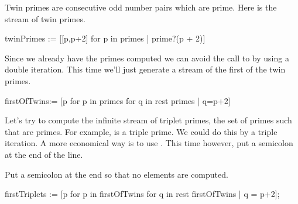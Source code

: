 {\begin{xtc}
\begin{TeXOutput}
\begin{fricasmath}{6}
\end{fricasmath}
\end{TeXOutput}
\end{xtc}
\begin{xtc}
\begin{xtccomment}
Twin primes are consecutive odd number pairs which are prime.
Here is the stream of twin primes.
\end{xtccomment}
\begin{spadsrc}
twinPrimes := [[p,p+2] for p in primes | prime?(p + 2)]
\end{spadsrc}
\begin{TeXOutput}
\begin{fricasmath}{7}
%
\end{fricasmath}
\end{TeXOutput}
\end{xtc}
\begin{xtc}
\begin{xtccomment}
Since we already have the primes computed we can
avoid the call to 
by using a double iteration.
This time we'll just generate a stream of the first of the twin primes.
\end{xtccomment}
\begin{spadsrc}
firstOfTwins:= [p for p in primes for q in rest primes | q=p+2]
\end{spadsrc}
\begin{TeXOutput}
\begin{fricasmath}{8}
%
\end{fricasmath}
\end{TeXOutput}
\end{xtc}

Let's try to compute the infinite stream of triplet primes,
the set of primes  such that \spad{[p,p+2,p+4]}
are primes. For example, \spad{[3,5,7]} is a triple prime.
We could do this by a triple  iteration.
A more economical way is to use .
This time however, put a semicolon at the end of the line.

\begin{xtc}
\begin{xtccomment}
Put a semicolon at the end so that no
elements are computed.
\end{xtccomment}
\begin{spadsrc}
firstTriplets := [p for p in firstOfTwins for q in rest firstOfTwins | q = p+2];
\end{spadsrc}
\end{xtc}

}
